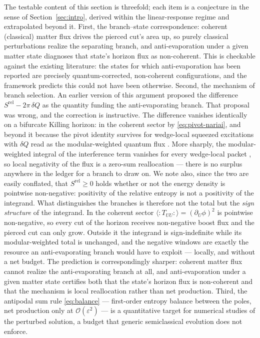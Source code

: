 \documentclass[11pt]{article}
\newcommand{\Srel}{S^{\mathrm{rel}}}
\begin{document}
The testable content of this section is threefold; each item is a conjecture in the sense of Section~\ref{sec:intro}, derived within the linear-response regime and extrapolated beyond it. First, the branch--state correspondence: coherent (classical) matter flux drives the pierced cut's area up, so purely classical perturbations realize the separating branch, and anti-evaporation under a given matter state diagnoses that state's horizon flux as non-coherent. This is checkable against the existing literature: the states for which anti-evaporation has been reported are precisely quantum-corrected, non-coherent configurations, and the framework predicts this could not have been otherwise. Second, the mechanism of branch selection. An earlier version of this argument proposed the difference $\Srel - 2\pi\,\delta Q$ as the quantity funding the anti-evaporating branch. That proposal was wrong, and the correction is instructive. The difference vanishes identically on a bifurcate Killing horizon: in the coherent sector by \eqref{eq:pivot-nariai}, and beyond it because the pivot identity survives for wedge-local squeezed excitations with $\delta Q$ read as the modular-weighted quantum flux \cite{SuppNariai}. More sharply, the modular-weighted integral of the interference term vanishes for every wedge-local packet \cite{SuppNariai}, so local negativity of the flux is a zero-sum reallocation --- there is no surplus anywhere in the ledger for a branch to draw on. We note also, since the two are easily conflated, that $\Srel \geq 0$ holds whether or not the energy density is pointwise non-negative: positivity of the relative entropy is not a positivity of the integrand. What distinguishes the branches is therefore not the total but the \emph{sign structure} of the integrand. In the coherent sector $\langle{:}T_{UU}{:}\rangle = (\partial_U\phi)^2$ is pointwise non-negative, so every cut of the horizon receives non-negative boost flux and the pierced cut can only grow. Outside it the integrand is sign-indefinite while its modular-weighted total is unchanged, and the negative windows are exactly the resource an anti-evaporating branch would have to exploit --- locally, and without a net budget. The prediction is correspondingly sharper: coherent matter flux cannot realize the anti-evaporating branch at all, and anti-evaporation under a given matter state certifies both that the state's horizon flux is non-coherent and that the mechanism is local reallocation rather than net production. Third, the antipodal sum rule \eqref{eq:balance} --- first-order entropy balance between the poles, net production only at $\mathcal{O}(\varepsilon^2)$ --- is a quantitative target for numerical studies of the perturbed solution, a budget that generic semiclassical evolution does not enforce.
\end{document}
